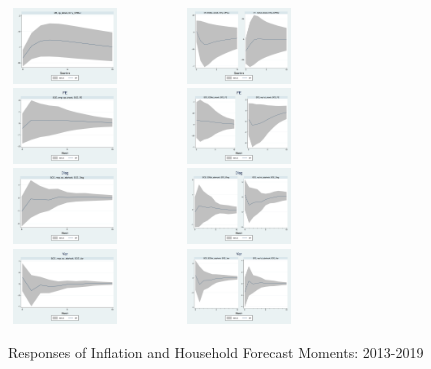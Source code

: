 \documentclass[]{article}
\begin{document}
	\begin{figure}[ht]
		\centering
		\includegraphics[width=3cm,height=2cm]{figures/CPIAU_ashocks_nmpM.png}  
		\includegraphics[width=6cm,height=2cm]{figures/CPIAU_ashocksM.png} \\
		\smallskip
		\includegraphics[width=3cm,height=2cm]{figures/SCEFE_ashocks_nmpM.png} 
		\includegraphics[width=6cm,height=2cm]{figures/SCEFE_ashocksM.png} \\
		\smallskip
		\includegraphics[width=3cm,height=2cm]{figures/SCEDisg_ab_ashocks_nmpM.png} 
		\includegraphics[width=6cm,height=2cm]{figures/SCEDisg_ab_ashocksM.png} \\
		\smallskip 
		\includegraphics[width=3cm,height=2cm]{figures/SCEVar_ab_ashocks_nmpM.png} 
		\includegraphics[width=6cm,height=2cm]{figures/SCEVar_ab_ashocksM.png} 
		\caption{ Responses of Inflation and Household Forecast Moments: 2013-2019}
		\label{SCE_IR}
	\end{figure}
	
\end{document}
